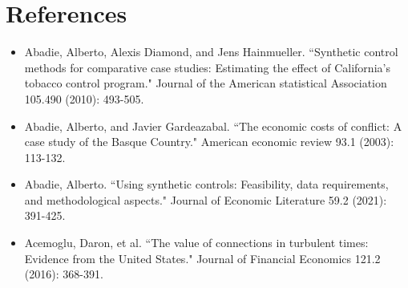 \documentclass[12pt,a4paper,draft]{article}
\begin{document}
\section{References}
\begin{itemize}
    \item Abadie, Alberto, Alexis Diamond, and Jens Hainmueller. ``Synthetic control methods for comparative case studies: Estimating the effect of California's tobacco control program." Journal of the American statistical Association 105.490 (2010): 493-505.
    \item Abadie, Alberto, and Javier Gardeazabal. ``The economic costs of conflict: A case study of the Basque Country." American economic review 93.1 (2003): 113-132.
    \item Abadie, Alberto. ``Using synthetic controls: Feasibility, data requirements, and methodological aspects." Journal of Economic Literature 59.2 (2021): 391-425.
    \item Acemoglu, Daron, et al. ``The value of connections in turbulent times: Evidence from the United States." Journal of Financial Economics 121.2 (2016): 368-391.
\end{itemize}
\end{document}
